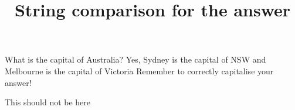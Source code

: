 \documentclass[hidesidemenu]{webquiz}
\title{String comparison for the answer}
\begin{document}
  \begin{question}     %
     What is the capital of Australia?
     \whenRight  Yes, Sydney is the capital of NSW and Melbourne is the
     capital of Victoria
     \whenWrong Remember to correctly capitalise your answer!
     \begin{choice}
       \incorrect This should not be here
     \end{choice}
  \end{question}
\end{document}
